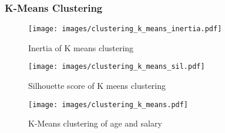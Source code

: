 \subsubsection{K-Means Clustering}

\begin{figure}[H]
    \centering
    \texttt{[image: images/clustering\_k\_means\_inertia.pdf]} %
    \caption{Inertia of K means clustering}
    \label{fig:inertia of k means clustering}
\end{figure}

\begin{figure}[H]
    \centering
    \texttt{[image: images/clustering\_k\_means\_sil.pdf]} %
    \caption{Silhouette score of K meens clustering}
    \label{fig:silhouette of k means clustering}
\end{figure}

\begin{figure}[H]
    \centering
    \texttt{[image: images/clustering\_k\_means.pdf]} %
    \caption{K-Means clustering of age and salary}
    \label{fig:kMeans clustering of age and salary}
\end{figure}
